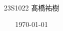 \documentclass[uplatex, a4paper, 12pt, openany, oneside]{jsbook}
\title{
  \centering
    \scalebox{1.0}{インテリジェントロボットモーション}\\
    \scalebox{0.8}{(軌道計画)}\\
    \vspace{-0.3zh}
    \scalebox{0.7}{Intelligent robot motion}\\
    \scalebox{0.7}{(Trajectory plan)}\\
    \vspace{-5.0zh}
}
\date{\today}
\author{23S1022 髙橋祐樹}
\begin{document}
\frontmatter{}
%

%
\mainmatter{}
%

%

%

%
% 
\backmatter{}
%

%
\end{document}
